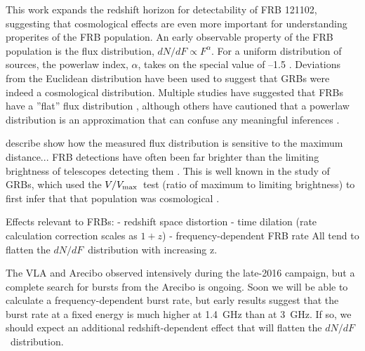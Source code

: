 \documentclass[twocolumn]{aastex61}
\newcommand{\frb}{FRB 121102}
\begin{document}
This work expands the redshift horizon for detectability of \frb, suggesting that cosmological effects are even more important for understanding properites of the FRB population. An early observable property of the FRB population is the flux distribution, $dN/dF \propto F^{\alpha}$. For a uniform distribution of sources, the powerlaw index, $\alpha$, takes on the special value of --1.5 \citep[the ''Euclidean distribution'';][]{2016MNRAS.462..941L}. Deviations from the Euclidean distribution have been used to suggest that GRBs were indeed a cosmological distribution. Multiple studies have suggested that FRBs have a ''flat'' flux distribution \citep[$-0.5<\alpha<-0.9$;][]{2016ApJ...830...75V, 2016arXiv160206099L, 2016arXiv161100458L}, although others have cautioned that a powerlaw distribution is an approximation that can confuse any meaningful inferences \citep{2017arXiv170208040C}.

\citet{2017arXiv170208040C} describe show how the measured flux distribution is sensitive to the maximum distance...
FRB detections have often been far brighter than the limiting brightness of telescopes detecting them \citep{2007Sci...318..777L, 2016arXiv161105758R}. 
This is well known in the study of GRBs, which used the $V/V_{\rm{max}}$\ test (ratio of maximum to limiting brightness) to first infer that that population was cosmological \citep{1992ApJ...388L..45M}.

Effects relevant to FRBs:
- redshift space distortion
- time dilation (rate calculation correction scales as $1+z$)
- frequency-dependent FRB rate
All tend to flatten the $dN/dF$\ distribution with increasing z.

The VLA and Arecibo observed intensively during the late-2016 campaign, but a complete search for bursts from the Arecibo is ongoing. Soon we will be able to calculate a frequency-dependent burst rate, but early results suggest that the burst rate at a fixed energy is much higher at 1.4~GHz than at 3~GHz. If so, we should expect an additional redshift-dependent effect that will flatten the $dN/dF$\ distribution.


\end{document}
